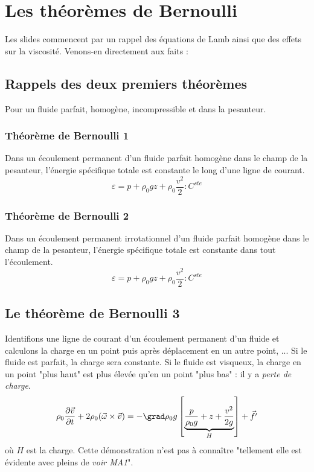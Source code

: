 	
	
\section{Les théorèmes de Bernoulli}
Les slides commencent par un rappel des équations de Lamb ainsi que des effets sur la viscosité.
Venons-en directement aux faits :
	
	\subsection{Rappels des deux premiers théorèmes}
	Pour un fluide parfait, homogène, incompressible et dans la pesanteur.
	
		\subsubsection{Théorème de Bernoulli 1}
		Dans un écoulement permanent d'un fluide parfait homogène dans le champ de la pesanteur, 
		l'énergie spécifique totale est constante le long d'une ligne de courant.
		\begin{equation}
		\varepsilon = p + \rho_0gz + \rho_0\frac{v^2}{2} : C^{ste}
		\end{equation}
		
		\subsubsection{Théorème de Bernoulli 2}
		Dans un écoulement permanent irrotationnel d'un fluide parfait homogène dans le champ de 
		la pesanteur, l'énergie spécifique totale est constante dans tout l'écoulement.
		\begin{equation}
		\varepsilon = p + \rho_0gz + \rho_0\frac{v^2}{2} : C^{ste}
		\end{equation}
		
	\subsection{Le théorème de Bernoulli 3}
	Identifions une ligne de courant d'un écoulement permanent d'un fluide et calculons la charge en
	un point puis après déplacement en un autre point, ... Si le fluide est parfait, la charge sera
	constante. Si le fluide est visqueux, la charge en un point "plus haut" est plus élevée qu'en 
	un point "plus bas" : il y a \textit{perte de charge}.
	\begin{equation}
	\rho_0\dfrac{\partial \vec{v}}{\partial t} + 2\rho_0(\vec{\omega}\times\vec{v}) = -\grad \rho_0g
	\left[\underbrace{\dfrac{p}{\rho_0g}+z+\dfrac{v^2}{2g}}_{H}\right] + \vec{f'}
	\end{equation}
	où $H$ est la charge. Cette démonstration n'est pas à connaître "tellement elle est évidente avec 
	pleins de \textit{voir MA1}".\\
		
